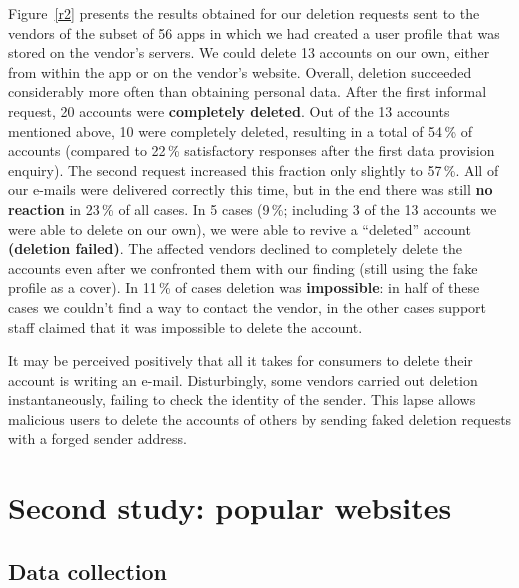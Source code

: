 \documentclass{llncs}
\begin{document}
Figure~\ref{r2} presents the results obtained for our deletion requests sent to the vendors of the subset of 56 apps in which we had created a user profile that was stored on the vendor's servers. We could delete 13 accounts on our own, either from within the app or on the vendor's website. Overall, deletion succeeded considerably more often than obtaining personal data. After the first informal request, 20 accounts were \textbf{completely deleted}. Out of the 13 accounts mentioned above, 10 were completely deleted, resulting in a total of 54\,\% of accounts (compared to 22\,\% satisfactory responses after the first data provision enquiry).
The second request increased this fraction only slightly to 57\,\%. All of our e-mails were delivered correctly this time, but in the end there was still \textbf{no reaction} in 23\,\% of all cases. In 5 cases (9\,\%; including 3 of the 13 accounts we were able to delete on our own), we were able to revive a ``deleted'' account \textbf{(deletion failed)}. The affected vendors declined to completely delete the accounts even after we confronted them with our finding (still using the fake profile as a cover). In 11\,\% of cases deletion was \textbf{impossible}: in half of these cases we couldn't find a way to contact the vendor, in the other cases support staff claimed that it was impossible to delete the account.

It may be perceived positively that all it takes for consumers to delete their account is writing an e-mail. Disturbingly, some vendors carried out deletion instantaneously, failing to check the identity of the sender. This lapse allows malicious users to delete the accounts of others by sending faked deletion requests with a forged sender address.



\section{Second study: popular websites}

\subsection{Data collection}
\end{document}
